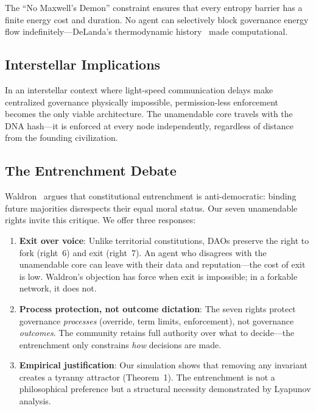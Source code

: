 \documentclass[11pt,a4paper]{article}
\begin{document}
\noindent The ``No Maxwell's Demon'' constraint ensures that every entropy barrier has a finite energy cost and duration. No agent can selectively block governance energy flow indefinitely---DeLanda's thermodynamic history~\cite{delanda} made computational.

\subsection{Interstellar Implications}

In an interstellar context where light-speed communication delays make centralized governance physically impossible, permission-less enforcement becomes the only viable architecture. The unamendable core travels with the DNA hash---it is enforced at every node independently, regardless of distance from the founding civilization.

\subsection{The Entrenchment Debate}
\label{sec:waldron}

Waldron~\cite{waldron} argues that constitutional entrenchment is anti-democratic: binding future majorities disrespects their equal moral status. Our seven unamendable rights invite this critique. We offer three responses:

\begin{enumerate}
    \item \textbf{Exit over voice}: Unlike territorial constitutions, DAOs preserve the right to fork (right~6) and exit (right~7). An agent who disagrees with the unamendable core can leave with their data and reputation---the cost of exit is low. Waldron's objection has force when exit is impossible; in a forkable network, it does not.
    \item \textbf{Process protection, not outcome dictation}: The seven rights protect governance \emph{processes} (override, term limits, enforcement), not governance \emph{outcomes}. The community retains full authority over what to decide---the entrenchment only constrains \emph{how} decisions are made.
    \item \textbf{Empirical justification}: Our simulation shows that removing any invariant creates a tyranny attractor (Theorem~1). The entrenchment is not a philosophical preference but a structural necessity demonstrated by Lyapunov analysis.
\end{enumerate}
\end{document}
